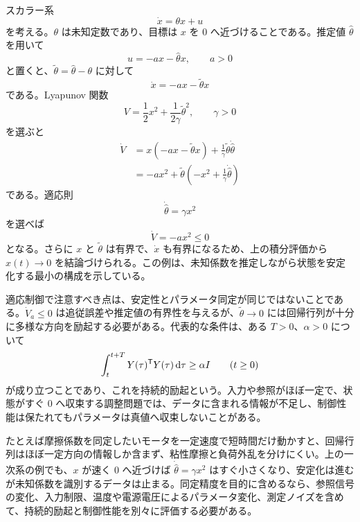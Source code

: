 \begin{example}[未知係数をもつ一次系の適応安定化]
スカラー系
\begin{equation}
  \dot{x}=\theta x+u
\end{equation}
を考える。$\theta$ は未知定数であり、目標は $x$ を 0 へ近づけることである。推定値 $\hat{\theta}$ を用いて
\begin{equation}
  u=-a x-\hat{\theta}x,\qquad a>0
\end{equation}
と置くと、$\tilde{\theta}=\hat{\theta}-\theta$ に対して
\begin{equation}
  \dot{x}=-a x-\tilde{\theta}x
\end{equation}
である。Lyapunov 関数
\begin{equation}
  V=\frac{1}{2}x^2+\frac{1}{2\gamma}\tilde{\theta}^2,
  \qquad \gamma>0
\end{equation}
を選ぶと
\begin{align}
  \dot{V}
  &=x(-a x-\tilde{\theta}x)
    +\frac{1}{\gamma}\tilde{\theta}\dot{\hat{\theta}}\\
  &=-a x^2+\tilde{\theta}
    \left(-x^2+\frac{1}{\gamma}\dot{\hat{\theta}}\right)
\end{align}
である。適応則
\begin{equation}
  \dot{\hat{\theta}}=\gamma x^2
\end{equation}
を選べば
\begin{equation}
  \dot{V}=-a x^2\le0
\end{equation}
となる。さらに $x$ と $\tilde{\theta}$ は有界で、$\dot{x}$ も有界になるため、上の積分評価から $x(t)\to0$ を結論づけられる。この例は、未知係数を推定しながら状態を安定化する最小の構成を示している。
\end{example}

適応制御で注意すべき点は、安定性とパラメータ同定が同じではないことである。$\dot{V}_a\le0$ は追従誤差や推定値の有界性を与えるが、$\tilde{\theta}\to0$ には回帰行列が十分に多様な方向を励起する必要がある。代表的な条件は、ある $T>0$、$\alpha>0$ について
\begin{equation}
  \int_t^{t+T}Y(\tau)^{\mathsf{T}} Y(\tau)\,\mathrm{d}\tau\ge\alpha I
  \qquad(t\ge0)
\end{equation}
が成り立つことであり、これを持続的励起という。入力や参照がほぼ一定で、状態がすぐ 0 へ収束する調整問題では、データに含まれる情報が不足し、制御性能は保たれてもパラメータは真値へ収束しないことがある。

たとえば摩擦係数を同定したいモータを一定速度で短時間だけ動かすと、回帰行列はほぼ一定方向の情報しか含まず、粘性摩擦と負荷外乱を分けにくい。上の一次系の例でも、$x$ が速く 0 へ近づけば $\dot{\hat{\theta}}=\gamma x^2$ はすぐ小さくなり、安定化は進むが未知係数を識別するデータは止まる。同定精度を目的に含めるなら、参照信号の変化、入力制限、温度や電源電圧によるパラメータ変化、測定ノイズを含めて、持続的励起と制御性能を別々に評価する必要がある。

